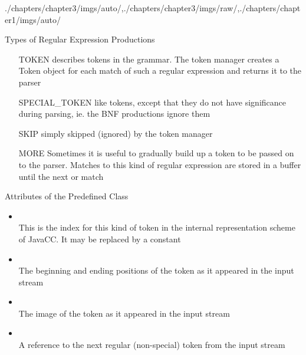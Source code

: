 \begin{graphicspathcontext}{{./chapters/chapter3/imgs/auto/},{./chapters/chapter3/imgs/raw/},{./chapters/chapter1/imgs/auto/}}
\begin{bibunit}[apalike]
\begin{frame}{Types of Regular Expression Productions }
	\begin{enumerate}
	\item[TOKEN] describes tokens in the grammar. The token manager creates a Token object for each match of such a regular expression and returns it to the parser
	\vfill
	\item[SPECIAL\_TOKEN] like tokens, except that they do not have significance during parsing, ie. the BNF productions ignore them
	\vfill
	\item[SKIP] simply skipped (ignored) by the token manager
	\vfill
	\item[MORE] Sometimes it is useful to gradually build up a token to be passed on to the parser. Matches to this kind of regular expression are stored in a buffer until the next  or  match
	\end{enumerate}
\end{frame}

\begin{frame}{Attributes of the Predefined  Class}
	\begin{itemize}
	\item {} \\
		This is the index for this kind of token in the internal representation scheme of JavaCC. It may be replaced by a constant
	\vfill
	\item {} \\
		The beginning and ending positions of the token as it appeared in the input stream
	\vfill
	\item {} \\
		The image of the token as it appeared in the input stream
	\vfill
	\item {} \\
		A reference to the next regular (non-special) token from the input stream
	\end{itemize}
\end{frame}


\end{bibunit}
\end{graphicspathcontext}
